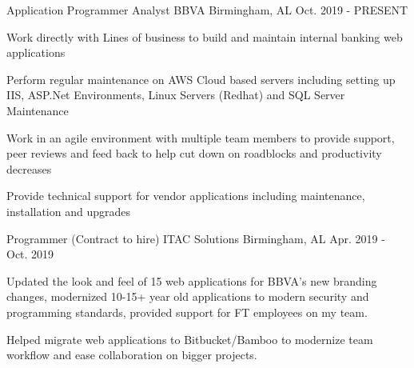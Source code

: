 
\begin{cventries}
  \cventry
    {Application Programmer Analyst} %
    {BBVA} %
    {Birmingham, AL} %
    {Oct. 2019 - PRESENT} %
    {
      \begin{cvitems} %
        \item {Work directly with Lines of business to build and maintain internal banking web applications }
        \item {Perform regular maintenance on AWS Cloud based servers including setting up IIS, ASP.Net Environments, Linux Servers (Redhat) and SQL Server Maintenance}
        \item {Work in an agile environment with multiple team members to provide support, peer reviews and feed back to help cut down on roadblocks and productivity decreases}
        \item {Provide technical support for vendor applications including maintenance, installation and upgrades}
      \end{cvitems}
    }

  \cventry
    {Programmer (Contract to hire)} %
    {ITAC Solutions} %
    {Birmingham, AL} %
    {Apr. 2019 - Oct. 2019} %
    {
      \begin{cvitems} %
        \item {Updated the look and feel of 15 web applications for BBVA's new branding changes, modernized 10-15+ year old applications to modern security and programming standards, provided support for FT employees on my team.}
        \item {Helped migrate web applications to Bitbucket/Bamboo to modernize team workflow and ease collaboration on bigger projects.}
      \end{cvitems}
    }


\end{cventries}
